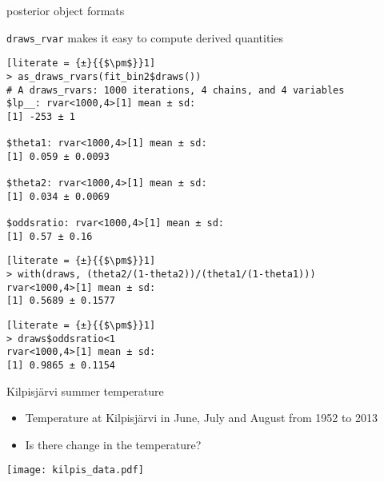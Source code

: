 \documentclass[finnish,english,t]{beamer}
\begin{document}
\begin{frame}[fragile]{posterior object formats}

 \vspace{-0.8\baselineskip}
  \texttt{draws\_rvar} makes it easy to compute derived quantities
  
{\footnotesize
\begin{lstlisting}[literate = {±}{{$\pm$}}1]
> as_draws_rvars(fit_bin2$draws())
# A draws_rvars: 1000 iterations, 4 chains, and 4 variables
$lp__: rvar<1000,4>[1] mean ± sd:
[1] -253 ± 1 

$theta1: rvar<1000,4>[1] mean ± sd:
[1] 0.059 ± 0.0093 

$theta2: rvar<1000,4>[1] mean ± sd:
[1] 0.034 ± 0.0069 

$oddsratio: rvar<1000,4>[1] mean ± sd:
[1] 0.57 ± 0.16
\end{lstlisting}
    \pause
    \color{black}
\begin{lstlisting}[literate = {±}{{$\pm$}}1]
> with(draws, (theta2/(1-theta2))/(theta1/(1-theta1)))
rvar<1000,4>[1] mean ± sd:
[1] 0.5689 ± 0.1577 
\end{lstlisting}
\pause
\begin{lstlisting}[literate = {±}{{$\pm$}}1]
> draws$oddsratio<1
rvar<1000,4>[1] mean ± sd:
[1] 0.9865 ± 0.1154 
\end{lstlisting}
  }

\end{frame}


  

\begin{frame}{Kilpisjärvi summer temperature}
  
  \begin{itemize}
  \item Temperature at Kilpisjärvi in June, July and August from 1952 to 2013
  \item Is there change in the temperature?
  \end{itemize}
  \begin{center}
    \texttt{[image: kilpis\_data.pdf]}
  \end{center}
  
\end{frame}
\end{document}

